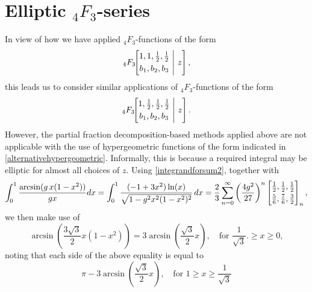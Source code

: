 \documentclass[12pt]{article}
\begin{document}
\section{Elliptic ${}_{4}F_{3}$-series}
 In view of how we have applied ${}_{4}F_{3}$-functions of the form 
\begin{equation*}
 {}_{4}F_{3}\!\!\left[ \begin{matrix} 
 1, 1, \frac{1}{2}, \frac{1}{2} \vspace{1mm}\\ 
 b_1, b_2, b_3 \end{matrix} \ \Bigg| \ z \right], 
\end{equation*}
 this leads us to consider similar applications of ${}_{4}F_{3}$-functions of the form 
\begin{equation}\label{alternativehypergeometric}
 {}_{4}F_{3}\!\!\left[ \begin{matrix} 
 1, \frac{1}{2}, \frac{1}{2}, \frac{1}{2} \vspace{1mm}\\ 
 b_1, b_2, b_3 \end{matrix} \ \Bigg| \ z \right]. 
\end{equation}
 However, the partial fraction decomposition-based methods applied above are not applicable with the use of hypergeometric 
 functions of the form indicated in \eqref{alternativehypergeometric}. Informally, this is because a required integral may be 
 elliptic for almost all choices of $z$. Using \eqref{integrandforsum2}, together with 
\begin{equation*}
 \int_{0}^{1} \frac{\arcsin (g \, x(1 - x^2))}{{g x}} dx = \int_{0}^{1} \frac{(-1 + 3x^2)\ln(x)}{\sqrt{1 - g^2 x^2(1 - x^2)^2}} \, dx = 
 \frac{2}{3}\sum_{n=0}^{\infty} \left( \frac{4g^2 }{27} \right)^{n} \left[ \begin{matrix} \frac{1}{2}, \frac{1}{2}, \frac{1}{2} \vspace{1mm} \\ 
 \frac{5}{6}, \frac{7}{6}, \frac{3}{2} \end{matrix} \right]_{n}, 
\end{equation*}
 we then make use of 
\begin{equation*}
 \arcsin\left(\frac{3\sqrt{3}}{2} x(1 - x^2)\right) = 3 \arcsin\left(\frac{\sqrt{3}}{2} x\right), \quad \text{for } \frac{1}{\sqrt{3}} .\geq x 
 \geq 0, 
\end{equation*}
 noting that each side of the above equality is equal to 
\begin{equation*}
 \pi - 3 \arcsin\left(\frac{\sqrt{3}}{2} x\right), \quad \text{for } 
 1 \geq x \geq \frac{1}{\sqrt{3}}
\end{equation*}
\end{document}
